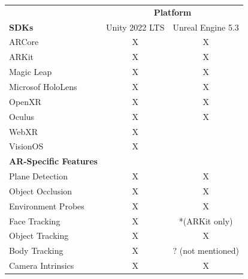 \documentclass{vgtc}                          %
\begin{document}
\begin{table}[ht!]
	\centering

	\begin{tabular}{l c c}
		\toprule
		                              & \multicolumn{2}{c}{\textbf{Platform}}                     \\
		\cmidrule(l){2-3}
		\textbf{SDKs}                 & Unity 2022 LTS                        & Unreal Engine 5.3 \\
		\midrule
		ARCore                        & X                                     & X                 \\
		ARKit                         & X                                     & X                 \\
		Magic Leap                    & X                                     & X                 \\
		Microsof HoloLens             & X                                     & X                 \\
		OpenXR                        & X                                     & X                 \\
		Oculus                        & X                                     & X                 \\
		WebXR                         & X                                     &                   \\
		VisionOS                      & X                                     &                   \\
		\midrule
		\textbf{AR-Specific Features} &                                       &                   \\
		\midrule
		Plane Detection               & X                                     & X                 \\
		Object Occlusion              & X                                     & X                 \\
		Environment Probes            & X                                     & X                 \\
		Face Tracking                 & X                                     & *(ARKit only)     \\
		Object Tracking               & X                                     & X                 \\
		Body Tracking                 & X                                     & ? (not mentioned) \\
		Camera Intrinsics             & X                                     & X                 \\

\end{tabular}
\end{table}
\end{document}
